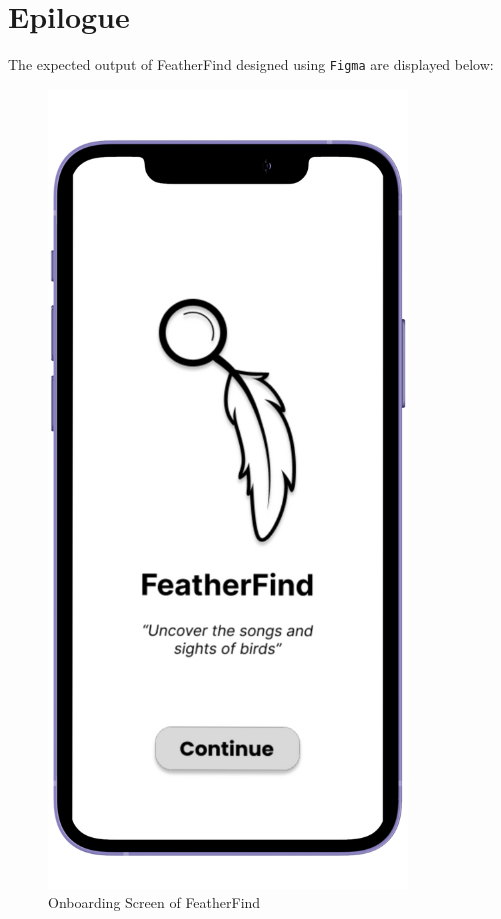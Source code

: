 \chapter{Epilogue}
The expected output of FeatherFind designed using \texttt{Figma} are displayed
below:
\begin{figure}[h!]
    \centering
    \includegraphics[scale=0.6]{images/onboarding_mockup.png}
    \caption{Onboarding Screen of
        FeatherFind}%
\end{figure}
